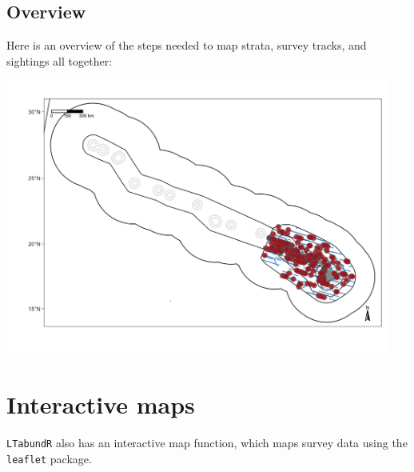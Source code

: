 \documentclass[
]{book}
\newenvironment{Shaded}{\begin{snugshade}}{\end{snugshade}}
\newcommand{\AttributeTok}[1]{\textcolor[rgb]{0.77,0.63,0.00}{#1}}
\newcommand{\DecValTok}[1]{\textcolor[rgb]{0.00,0.00,0.81}{#1}}
\newcommand{\FunctionTok}[1]{\textcolor[rgb]{0.00,0.00,0.00}{#1}}
\newcommand{\NormalTok}[1]{#1}
\newcommand{\OtherTok}[1]{\textcolor[rgb]{0.56,0.35,0.01}{#1}}
\newcommand{\SpecialCharTok}[1]{\textcolor[rgb]{0.00,0.00,0.00}{#1}}
\newcommand{\StringTok}[1]{\textcolor[rgb]{0.31,0.60,0.02}{#1}}
\begin{document}
\hypertarget{overview-1}{%
\subsection*{Overview}\label{overview-1}}

Here is an overview of the steps needed to map strata, survey tracks, and sightings all together:

\begin{Shaded}
\end{Shaded}

\includegraphics[width=0.95\textwidth,height=\textheight]{img/map_overview.png}

\hypertarget{interactive-maps}{%
\section*{Interactive maps}\label{interactive-maps}}

\texttt{LTabundR} also has an interactive map function, which maps survey data using the \texttt{leaflet} package.
\end{document}
